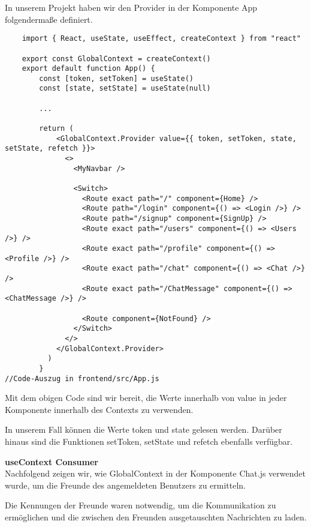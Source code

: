 In unserem Projekt haben wir den Provider in der Komponente App folgendermaße definiert.

 \begin{lstlisting}
    import { React, useState, useEffect, createContext } from "react"

    export const GlobalContext = createContext()
    export default function App() {
        const [token, setToken] = useState()
        const [state, setState] = useState(null)
        
        ...
   
        return (
            <GlobalContext.Provider value={{ token, setToken, state, setState, refetch }}>
              <>
                <MyNavbar />
        
                <Switch>
                  <Route exact path="/" component={Home} />
                  <Route path="/login" component={() => <Login />} />
                  <Route path="/signup" component={SignUp} />
                  <Route exact path="/users" component={() => <Users />} />
                  <Route exact path="/profile" component={() => <Profile />} />
                  <Route exact path="/chat" component={() => <Chat />} />
                  <Route exact path="/ChatMessage" component={() => <ChatMessage />} />
        
                  <Route component={NotFound} />
                </Switch>
              </>
            </GlobalContext.Provider>
          )
        }
//Code-Auszug in frontend/src/App.js
 \end{lstlisting}
 Mit dem obigen Code sind wir bereit, die Werte innerhalb von value in jeder Komponente innerhalb des Contexts zu verwenden.

 In unserem Fall können die Werte token und state gelesen werden. Darüber hinaus sind die Funktionen setToken, setState und refetch ebenfalls verfügbar.


\textbf{useContext Consumer} \\
Nachfolgend zeigen wir, wie GlobalContext in der Komponente Chat.js verwendet wurde, um die Freunde des angemeldeten Benutzers zu ermitteln.

Die Kennungen der Freunde waren notwendig, um die Kommunikation zu ermöglichen und die zwischen den Freunden ausgetauschten Nachrichten zu laden.

